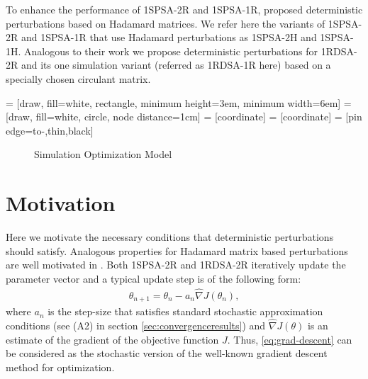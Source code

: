 \documentclass[letterpaper, 10 pt, conference]{ieeeconf}  %
\begin{document}
To enhance the performance of 1SPSA-2R and 1SPSA-1R, \cite{bhatnagar2003two}
proposed deterministic perturbations based on Hadamard matrices.
We refer here the variants of 1SPSA-2R and 1SPSA-1R that use Hadamard perturbations as
1SPSA-2H and 1SPSA-1H. Analogous to their work we propose deterministic perturbations
for 1RDSA-2R and its  one simulation variant (referred as 1RDSA-1R here) based on a
specially chosen circulant matrix.

 = [draw, fill=white, rectangle,
   minimum height=3em, minimum width=6em]
 = [draw, fill=white, circle, node distance=1cm]
 = [coordinate]
 = [coordinate]
 = [pin edge={to-,thin,black}]

\begin{figure}[t]
    \centering
{}
\caption{Simulation Optimization Model}
\label{fig:so}
\end{figure}

\section{Motivation}
Here we motivate the necessary conditions that deterministic perturbations should satisfy.
Analogous properties for Hadamard matrix based perturbations are well motivated in 
\cite{bhatnagar-book}.
Both 1SPSA-2R and 1RDSA-2R iteratively update the parameter vector and a typical update step
is of the following form:
\begin{align}
\label{eq:grad-descent}
\theta_{n+1} = \theta_n - a_n \widehat\nabla J(\theta_n), 
\end{align}
where $a_n$ is the step-size that satisfies standard stochastic approximation 
conditions (see (A2) in section \ref{sec:convergenceresults}) and $\widehat\nabla 
J(\theta)$ is an estimate of the gradient of the objective function $J$.
Thus, \eqref{eq:grad-descent} can be considered as 
the stochastic version of the well-known gradient descent method for optimization. 
\end{document}
